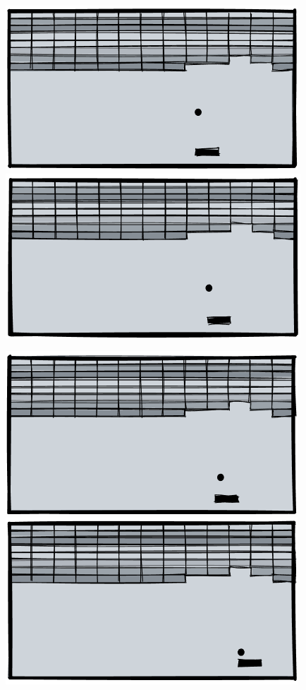 \begin{figure}[H]
\centering
\begin{minipage}{0.49\linewidth}
  \centering
  \includegraphics[width=0.618\linewidth]{pix/q_learning/game_1.png}
\end{minipage}%
\begin{minipage}{0.49\linewidth}
  \centering
  \includegraphics[width=0.618\linewidth]{pix/q_learning/game_2.png}
\end{minipage}
\end{figure}

\begin{figure}[H]
\centering
\begin{minipage}{0.49\linewidth}
  \centering
  \includegraphics[width=0.618\linewidth]{pix/q_learning/game_3.png}
\end{minipage}%
\begin{minipage}{0.49\linewidth}
  \centering
  \includegraphics[width=0.618\linewidth]{pix/q_learning/game_4.png}
\end{minipage}
\end{figure}

